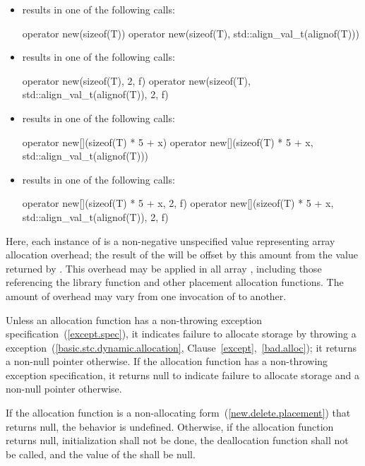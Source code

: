 \pnum
\begin{example}

\begin{itemize}
\item {} results in one of the following calls:
\begin{codeblock}
operator new(sizeof(T))
operator new(sizeof(T), std::align_val_t(alignof(T)))
\end{codeblock}
\item {} results in one of the following calls:
\begin{codeblock}
operator new(sizeof(T), 2, f)
operator new(sizeof(T), std::align_val_t(alignof(T)), 2, f)
\end{codeblock}
\item {} results in one of the following calls:
\begin{codeblock}
operator new[](sizeof(T) * 5 + x)
operator new[](sizeof(T) * 5 + x, std::align_val_t(alignof(T)))
\end{codeblock}
\item {} results in one of the following calls:
\begin{codeblock}
operator new[](sizeof(T) * 5 + x, 2, f)
operator new[](sizeof(T) * 5 + x, std::align_val_t(alignof(T)), 2, f)
\end{codeblock}
\end{itemize}
Here, each instance of  is a non-negative unspecified value
representing array allocation overhead; the result of the
 will be offset by this amount from the value
returned by . This overhead may be applied in all
array , including those referencing the
library function  and other
placement allocation functions. The amount of overhead may vary from one
invocation of  to another.
\end{example}

\pnum
\begin{note}
Unless an allocation function has a non-throwing
exception specification~(\ref{except.spec}),
it indicates failure to allocate storage by throwing a
%
%
 exception~(\ref{basic.stc.dynamic.allocation},
Clause~\ref{except},~\ref{bad.alloc});
it returns a non-null pointer otherwise. If the allocation function
has a non-throwing exception specification,
it returns null to indicate failure to allocate storage
and a non-null pointer otherwise.
\end{note}
If the allocation function is a non-allocating
form~(\ref{new.delete.placement}) that returns null,
the behavior is undefined.
Otherwise,
if the allocation function returns null, initialization shall not be
done, the deallocation function shall not be called, and the value of
the  shall be null.


